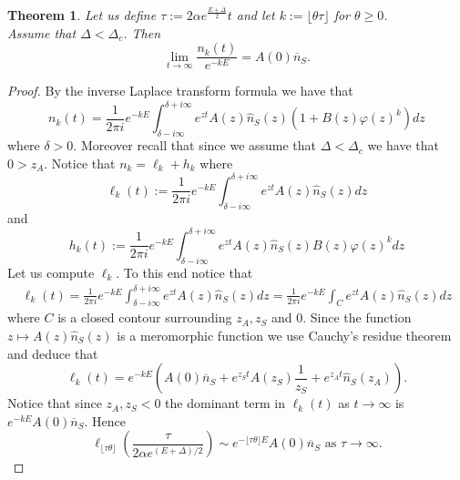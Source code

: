 \documentclass{article}
\numberwithin{equation}{section}
\theoremstyle{plain}
\newtheorem{theorem}{Theorem}[section]
\begin{document}
\begin{theorem} \label{theo:half line asymptotics delta subcrit}
Let us define $\tau:= 2 \alpha e^{\frac{E+ \Delta }{2}} t$ and let $k:=\lfloor \theta \tau \rfloor$ for  $\theta \geq 0$.
\\  Assume that $\Delta < \Delta_c $. 
Then 
    \begin{equation} \label{asympt half subc}
    \lim_{t \to \infty } \frac{ n_{k} (t) }{ e^{-k E} } = A(0) \overline n_S.
    \end{equation}
\end{theorem}
\begin{proof}
By the inverse Laplace transform formula we have that 
\[
n_k(t)= \frac{1}{2 \pi i } e^{- k E } \int_{\delta - i \infty }^{\delta + i \infty } e^{ zt } A(z) \hat{n}_S(z) \left( 1+ B(z)  \varphi(z)^k  \right) dz   
\]
where $\delta >   0$. Moreover recall that since we assume that $\Delta < \Delta_c$ we have that  $0> z_A $. 
Notice that $n_k=\ell_k+ h_k$ where  
\[
\ell_k (t):= \frac{1}{2 \pi i } e^{- k E } \int_{\delta - i \infty }^{\delta + i \infty } e^{ zt } A(z) \hat{n}_S(z)  dz
\]
and 
\begin{equation}\label{def:h_k}
h_k (t):= \frac{1}{2 \pi i } e^{- k E } \int_{\delta - i \infty }^{\delta + i \infty } e^{ zt } A(z) \hat{n}_S(z) B(z) \varphi(z)^k   dz
\end{equation}
Let us compute $\ell_k$. To this end notice that
\begin{align*}
\ell_k(t)=     \frac{1}{2 \pi i } e^{- k E } \int_{\delta - i \infty }^{\delta + i \infty } e^{ zt } A(z) \hat{n}_S(z)  dz=   \frac{1}{2 \pi i } e^{- k E } \int_{C} e^{ zt } A(z) \hat{n}_S(z)  dz
\end{align*}
where $C$ is a  closed contour surrounding $z_A, z_S $ and $ 0 $.
Since the function $ z \mapsto  A(z) \hat{n}_S(z) $ is a meromorphic function we use Cauchy's residue theorem and deduce that 
\[ 
\ell_k(t)= e^{- k E } \left( A(0) \overline {n}_S + e^{ z_S t } A(z_S ) \frac{1}{z_S} +  e^{ z_A t } \hat{n}_S(z_A ) \right). 
\]
Notice that since $z_A , z_S <0 $ the dominant term in $ \ell_k(t)$ as $t \rightarrow \infty $ is $ e^{- k E } A(0) \overline {n}_S $. Hence
\[
\ell_{ \lfloor \tau \theta \rfloor } \left( \frac{\tau }{ 2 \alpha e^{(E+\Delta)/2} }\right)  \sim  e^{- \lfloor  \tau \theta \rfloor E } A(0) \overline {n}_S  \text{ as } \tau \to \infty. 
\]




\end{proof}
\end{document}
